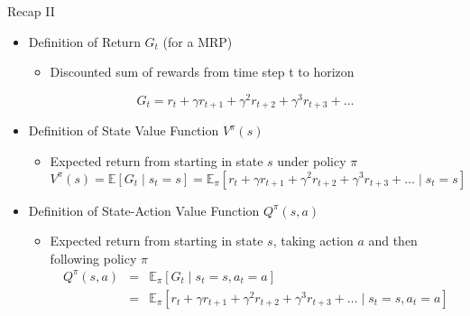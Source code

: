 \begin{frame}[c]{Recap II}

\begin{itemize}
	\item Definition of Return $G_t$ (for a MRP)
	\begin{itemize}
		\item Discounted sum of rewards from time step t to horizon
	\end{itemize}	
$$ G_t = r_t + \gamma r_{t+1} + \gamma^2 r_{t+2} + \gamma^3 r_{t+3} + \ldots$$

	\medskip
	\pause
	\item Definition of State Value Function $V^\pi (s) $
	\begin{itemize}
		\item Expected return from starting in state $s$ under policy $\pi$
		$$V^\pi (s) = \mathbb{E} [G_t \mid s_t = s] = \mathbb{E}_\pi [r_t + \gamma r_{t+1} + \gamma^2 r_{t+2} + \gamma^3 r_{t+3} + \ldots \mid s_t = s] $$
	\end{itemize}
	\medskip
	\pause
	\item Definition of State-Action Value Function $Q^\pi (s,a)$
	\begin{itemize}
	\item Expected return from starting in state $s$, taking action $a$ and then following
	policy $\pi$
	\begin{eqnarray}
	Q^\pi (s,a) &=& \mathbb{E}_{\pi}[G_t \mid s_t = s, a_t = a]  \nonumber \\
	&=& \mathbb{E}_{\pi}  [r_t + \gamma r_{t+1} + \gamma^2 r_{t+2} + \gamma^3 r_{t+3} + \ldots \mid s_t = s, a_t = a]\nonumber
	\end{eqnarray}

	
	\end{itemize}

\end{itemize}


\end{frame}
